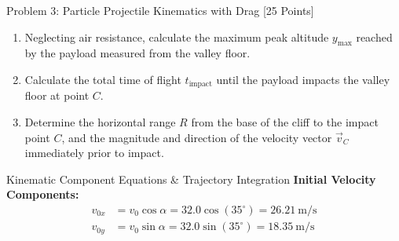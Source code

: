 \documentclass[11pt, a4paper, titlepage=false]{scrartcl}
\begin{document}
\begin{problembox}{Problem 3: Particle Projectile Kinematics with Drag \hfill [25 Points]}
\begin{center}
        \label{fig:projectile_diagram}
    \end{center}

    \begin{enumerate}[label=\alph*\lbrack\arabic*\rbrack, leftmargin=*, font=\bfseries\color{SecondaryTeal}]
        \item Neglecting air resistance, calculate the maximum peak altitude $y_{\max}$ reached by the payload measured from the valley floor.
        \item Calculate the total time of flight $t_{\text{impact}}$ until the payload impacts the valley floor at point $C$.
        \item Determine the horizontal range $R$ from the base of the cliff to the impact point $C$, and the magnitude and direction of the velocity vector $\vec{v}_C$ immediately prior to impact.
    \end{enumerate}
\end{problembox}

\begin{solutionworkspace}{Kinematic Component Equations \& Trajectory Integration}
    \textbf{Initial Velocity Components:}
    \begin{align*}
        v_{0x} &= v_0 \cos\alpha = 32.0 \cos(35^\circ) = \SI{26.21}{\meter\per\second} \\
        v_{0y} &= v_0 \sin\alpha = 32.0 \sin(35^\circ) = \SI{18.35}{\meter\per\second}
    \end{align*}

    \vspace{4.0cm}
\end{solutionworkspace}
\end{document}
